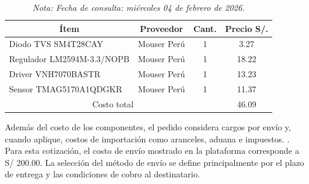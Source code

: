 \begin{table}[H]
\centering
\caption{Costo referencial de componentes electrónicos importados.}
\label{tab:4.Costo_componentes_mouser}
\begin{tabular}{|l|c|c|c|}
\hline
\multicolumn{1}{|c|}{Ítem} & Proveedor & Cant. & Precio S/. \\
\hline
Diodo TVS SM4T28CAY & Mouser Perú & 1 & 3.27 \\
\hline
Regulador LM2594M-3.3/NOPB & Mouser Perú & 1 & 18.22 \\
\hline
Driver VNH7070BASTR & Mouser Perú & 1 & 13.23 \\
\hline
Sensor TMAG5170A1QDGKR & Mouser Perú & 1 & 11.37 \\
\hline
\multicolumn{3}{|c|}{Costo total} & 46.09 \\
\hline
\end{tabular}
\caption*{\textit{Nota: Fecha de consulta: miércoles 04 de febrero de 2026.}}
\end{table}

Además del costo de los componentes, el pedido considera cargos por envío y, cuando aplique, costos de importación como aranceles, aduana e impuestos. \autocite{mouser_envio_tarifa_plana}. Para esta cotización, el costo de envío mostrado en la plataforma corresponde a S/ 200.00. La selección del método de envío se define principalmente por el plazo de entrega y las condiciones de cobro al destinatario.

